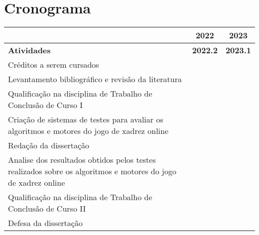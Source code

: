 \chapter{Cronograma}

\begin{tabular}{|p{12cm}|c|c|}
    \hline
                                                                                                                  & \textbf{2022}        & \textbf{2023}        \\
    \hline
    \textbf{Atividades}                                                                                           & \textbf{2022.2}      & \textbf{2023.1}      \\
    \hline
    Créditos a serem cursados                                                                                     & \cellcolor{gray!150} & \cellcolor{gray!150} \\
    \hline
    Levantamento bibliográfico e revisão da literatura                                                            & \cellcolor{gray!150} &                      \\
    \hline
    Qualificação na disciplina de Trabalho de Conclusão de Curso I                                                & \cellcolor{gray!150} &                      \\
    \hline
    Criação de sistemas de testes para avaliar os algoritmos e motores do jogo de xadrez online                   & \cellcolor{gray!150} & \cellcolor{gray!150} \\
    \hline
    Redação da dissertação                                                                                        & \cellcolor{gray!150} & \cellcolor{gray!150} \\
    \hline
    Analise dos resultados obtidos pelos testes realizados sobre os algoritmos e motores do jogo de xadrez online &                      & \cellcolor{gray!150} \\
    \hline
    Qualificação na disciplina de Trabalho de Conclusão de Curso II                                               &                      & \cellcolor{gray!150} \\
    \hline
    Defesa da dissertação                                                                                         &                      & \cellcolor{gray!150} \\
    \hline
\end{tabular}